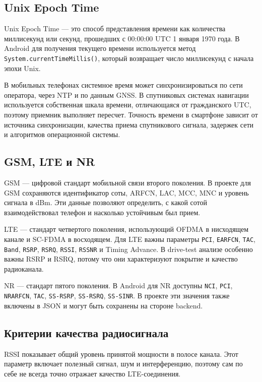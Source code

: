 \documentclass[14pt,a4paper]{extarticle}
\begin{document}
\subsection{Unix Epoch Time}

Unix Epoch Time --- это способ представления времени как количества миллисекунд или секунд, прошедших с 00:00:00 UTC 1 января 1970 года. В Android для получения текущего времени используется метод \texttt{System.currentTimeMillis()}, который возвращает число миллисекунд с начала эпохи Unix.

В мобильных телефонах системное время может синхронизироваться по сети оператора, через NTP и по данным GNSS. В спутниковых системах навигации используется собственная шкала времени, отличающаяся от гражданского UTC, поэтому приемник выполняет пересчет. Точность времени в смартфоне зависит от источника синхронизации, качества приема спутникового сигнала, задержек сети и алгоритмов операционной системы.

\subsection{GSM, LTE и NR}

GSM --- цифровой стандарт мобильной связи второго поколения. В проекте для GSM сохраняются идентификатор соты, ARFCN, LAC, MCC, MNC и уровень сигнала в dBm. Эти данные позволяют определить, с какой сотой взаимодействовал телефон и насколько устойчивым был прием.

LTE --- стандарт четвертого поколения, использующий OFDMA в нисходящем канале и SC-FDMA в восходящем. Для LTE важны параметры \texttt{PCI}, \texttt{EARFCN}, \texttt{TAC}, \texttt{Band}, \texttt{RSRP}, \texttt{RSRQ}, \texttt{RSSI}, \texttt{RSSNR} и Timing Advance. В drive-test анализе особенно важны RSRP и RSRQ, потому что они характеризуют покрытие и качество радиоканала.

NR --- стандарт пятого поколения. В Android для NR доступны \texttt{NCI}, \texttt{PCI}, \texttt{NRARFCN}, \texttt{TAC}, \texttt{SS-RSRP}, \texttt{SS-RSRQ}, \texttt{SS-SINR}. В проекте эти значения также включены в JSON и могут быть сохранены на стороне backend.

\subsection{Критерии качества радиосигнала}

RSSI показывает общий уровень принятой мощности в полосе канала. Этот параметр включает полезный сигнал, шум и интерференцию, поэтому сам по себе не всегда точно отражает качество LTE-соединения.
\end{document}
